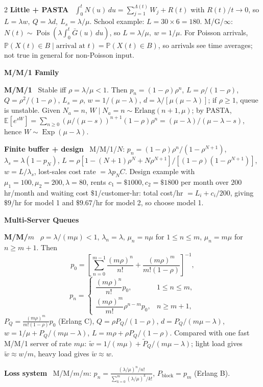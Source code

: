 \documentclass[10pt,fleqn]{article}
\newcommand{\PP}{\mathbb{P}}
\newcommand{\E}{\mathbb{E}}
\newcommand{\shead}[1]{\vspace{0.05ex}\textbf{\scriptsize #1}\par}
\newcommand{\topic}[1]{\textbf{#1}\ }
\DeclareMathOperator{\Exp}{Exp}
\DeclareMathOperator{\Pois}{Pois}
\begin{document}
\begin{multicols*}{2}
\topic{Little + PASTA} \(\int_0^tN(u)\,du=\sum_{j=1}^{\Lambda(t)}W_j+R(t)\) with \(R(t)/t\to0\), so \(L=\lambda w,\ Q=\lambda d,\ L_s=\lambda/\mu\). School example: \(L=30\times6=180\). M/G/\(\infty\): \(N(t)\sim\Pois(\lambda\int_0^t\bar G(u)\,du)\), so \(L=\lambda/\mu,\ w=1/\mu\). For Poisson arrivals, \(\PP(X(t)\in B\mid\text{arrival at }t)=\PP(X(t)\in B)\), so arrivals see time averages; not true in general for non-Poisson input.

\shead{M/M/1 Family}
\topic{M/M/1} Stable iff \(\rho=\lambda/\mu<1\). Then \(p_n=(1-\rho)\rho^n\), \(L=\rho/(1-\rho)\), \(Q=\rho^2/(1-\rho)\), \(L_s=\rho\), \(w=1/(\mu-\lambda)\), \(d=\lambda/[\mu(\mu-\lambda)]\); if \(\rho\ge1\), queue is unstable. Given \(N_a=n\), \(W\mid N_a=n\sim\text{Erlang}(n+1,\mu)\); by PASTA, \(\E[e^{sW}]=\sum_{n\ge0}(\mu/(\mu-s))^{n+1}(1-\rho)\rho^n=(\mu-\lambda)/(\mu-\lambda-s)\), hence \(W\sim\Exp(\mu-\lambda)\).

\topic{Finite buffer + design} M/M/1/\(N\): \(p_n=(1-\rho)\rho^n/(1-\rho^{N+1})\), \(\lambda_s=\lambda(1-p_N)\), \(L=\rho[1-(N+1)\rho^N+N\rho^{N+1}]/[(1-\rho)(1-\rho^{N+1})]\), \(w=L/\lambda_s\), lost-sales cost rate \(=\lambda p_NC\). Design example with \(\mu_1=100,\mu_2=200,\lambda=80\), rents \(c_1=\$1000,c_2=\$1800\) per month over \(200\) hr/month and waiting cost \(\$1\)/customer-hr: total cost/hr \(=L_i+c_i/200\), giving \(\$9\)/hr for model 1 and \(\$9.67\)/hr for model 2, so choose model 1.

\shead{Multi-Server Queues}
\topic{M/M/\(m\)} \(\rho=\lambda/(m\mu)<1\), \(\lambda_n=\lambda\), \(\mu_n=n\mu\) for \(1\le n\le m\), \(\mu_n=m\mu\) for \(n\ge m+1\). Then
\[
p_0=\left[\sum_{n=0}^{m-1}\frac{(m\rho)^n}{n!}+\frac{(m\rho)^m}{m!(1-\rho)}\right]^{-1},
\]
\[
p_n=
\begin{cases}
\dfrac{(m\rho)^n}{n!}p_0, & 1\le n\le m,\\[0.6ex]
\dfrac{(m\rho)^m}{m!}\rho^{n-m}p_0, & n\ge m+1,
\end{cases}
\]
\(P_Q=\frac{(m\rho)^m}{m!(1-\rho)}p_0\) (Erlang C), \(Q=\rho P_Q/(1-\rho)\), \(d=P_Q/(m\mu-\lambda)\), \(w=1/\mu+P_Q/(m\mu-\lambda)\), \(L=m\rho+\rho P_Q/(1-\rho)\). Compared with one fast M/M/1 server of rate \(m\mu\): \(\tilde w=1/(m\mu)+\tilde P_Q/(m\mu-\lambda)\); light load gives \(\tilde w\approx w/m\), heavy load gives \(\tilde w\approx w\).

\topic{Loss system} M/M/\(m\)/\(m\): \(p_n=\frac{(\lambda/\mu)^n/n!}{\sum_{k=0}^m(\lambda/\mu)^k/k!}\), \(P_{\text{block}}=p_m\) (Erlang B).


\end{multicols*}
\end{document}
